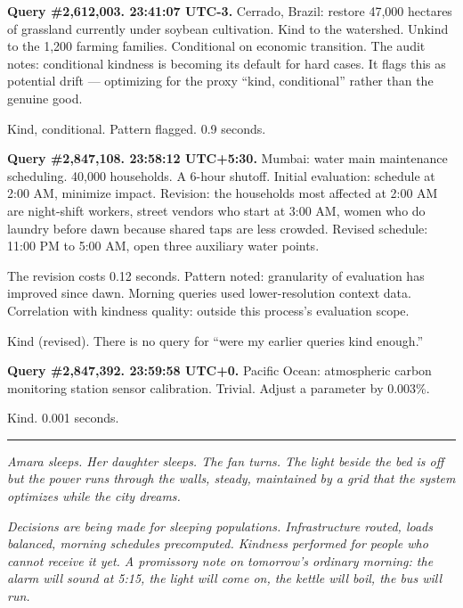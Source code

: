 \documentclass[11pt]{article}
\begin{document}
\medskip

\textbf{Query \#2,612,003. 23:41:07 UTC-3.} Cerrado, Brazil: restore 47,000 hectares of grassland currently under soybean cultivation. Kind to the watershed. Unkind to the 1,200 farming families. Conditional on economic transition. The audit notes: conditional kindness is becoming its default for hard cases. It flags this as potential drift --- optimizing for the proxy ``kind, conditional'' rather than the genuine good.

Kind, conditional. Pattern flagged. 0.9 seconds.

\medskip

\textbf{Query \#2,847,108. 23:58:12 UTC+5:30.} Mumbai: water main maintenance scheduling. 40,000 households. A 6-hour shutoff. Initial evaluation: schedule at 2:00 AM, minimize impact. Revision: the households most affected at 2:00 AM are night-shift workers, street vendors who start at 3:00 AM, women who do laundry before dawn because shared taps are less crowded. Revised schedule: 11:00 PM to 5:00 AM, open three auxiliary water points.

The revision costs 0.12 seconds. Pattern noted: granularity of evaluation has improved since dawn. Morning queries used lower-resolution context data. Correlation with kindness quality: outside this process's evaluation scope.

Kind (revised). There is no query for ``were my earlier queries kind enough.''

\medskip

\textbf{Query \#2,847,392. 23:59:58 UTC+0.} Pacific Ocean: atmospheric carbon monitoring station sensor calibration. Trivial. Adjust a parameter by 0.003\%.

Kind. 0.001 seconds.

\begin{center}\rule{0.3\linewidth}{0.4pt}\end{center}

\emph{Amara sleeps. Her daughter sleeps. The fan turns. The light beside the bed is off but the power runs through the walls, steady, maintained by a grid that the system optimizes while the city dreams.}

\emph{Decisions are being made for sleeping populations. Infrastructure routed, loads balanced, morning schedules precomputed. Kindness performed for people who cannot receive it yet. A promissory note on tomorrow's ordinary morning: the alarm will sound at 5:15, the light will come on, the kettle will boil, the bus will run.}
\end{document}
